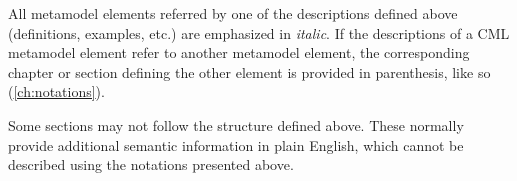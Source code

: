 All metamodel elements referred by one of the descriptions defined above
(definitions, examples, etc.) are emphasized in \emph{italic}.
If the descriptions of a CML metamodel element refer to another metamodel element,
the corresponding chapter or section defining the other element
is provided in parenthesis, like so (\ref{ch:notations}).

Some sections may not follow the structure defined above.
These normally provide additional semantic information in plain English,
which cannot be described using the notations presented above.
